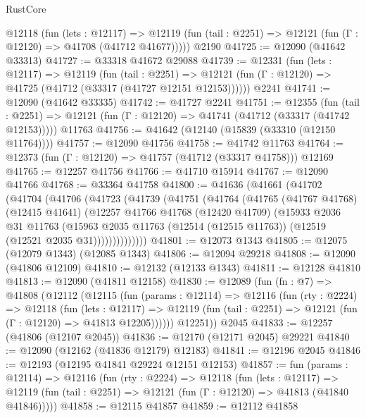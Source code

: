 \begin{lexlean}{RustCore}
\begin{coremodule}
    @12118
      (fun (lets : @12117) =>
      @12119 (fun (tail : @2251) => @12121 (fun (Γ : @12120) => @41708 (@41712 @41677)))))
    @2190
@41725 := @12090 (@41642 @33313)
@41727 := @33318 @41672 @29088
@41739 := @12331
    (fun (lets : @12117) =>
    @12119
      (fun (tail : @2251) =>
      @12121 (fun (Γ : @12120) => @41725 (@41712 (@33317 (@41727 @12151 @12153))))))
    @2241
@41741 := @12090 (@41642 @33335)
@41742 := @41727 @2241
@41751 := @12355
    (fun (tail : @2251) => @12121 (fun (Γ : @12120) => @41741 (@41712 (@33317 (@41742 @12153)))))
    @11763
@41756 := @41642 (@12140 (@15839 (@33310 (@12150 @11764))))
@41757 := @12090 @41756
@41758 := @41742 @11763
@41764 := @12373 (fun (Γ : @12120) => @41757 (@41712 (@33317 @41758))) @12169
@41765 := @12257 @41756
@41766 := @41710 @15914
@41767 := @12090 @41766
@41768 := @33364 @41758
@41800 := @41636
    (@41661
      (@41702
        (@41704
          (@41706
            (@41723
              (@41739
                (@41751
                  (@41764
                    (@41765
                      (@41767 @41768)
                      (@12415 @41641)
                      (@12257
                        @41766
                        @41768
                        (@12420 @41709)
                        (@15933
                          @2036
                          @31
                          @11763
                          (@15963
                            @2035
                            @11763
                            (@12514 (@12515 @11763))
                            (@12519 (@12521 @2035 @31))))))))))))))
@41801 := @12073 @1343
@41805 := @12075 (@12079 @1343) (@12085 @1343)
@41806 := @12094 @29218
@41808 := @12090 (@41806 @12109)
@41810 := @12132 (@12133 @1343)
@41811 := @12128 @41810
@41813 := @12090 (@41811 @12158)
@41830 := @12089
    (fun (fn : @7) =>
    @41808
      (@12112
        (@12115
          (fun (params : @12114) =>
          @12116
            (fun (rty : @2224) =>
            @12118
              (fun (lets : @12117) =>
              @12119 (fun (tail : @2251) => @12121 (fun (Γ : @12120) => @41813 @12205))))))
        @12251))
    @2045
@41833 := @12257 (@41806 (@12107 @2045))
@41836 := @12170 (@12171 @2045) @29221
@41840 := @12090 (@12162 (@41836 @12179) @12183)
@41841 := @12196 @2045
@41846 := @12193 (@12195 @41841 @29224 @12151 @12153)
@41857 := fun (params : @12114) =>
  @12116
    (fun (rty : @2224) =>
    @12118
      (fun (lets : @12117) =>
      @12119 (fun (tail : @2251) => @12121 (fun (Γ : @12120) => @41813 (@41840 @41846)))))
@41858 := @12115 @41857
@41859 := @12112 @41858

\end{coremodule}
\end{lexlean}
